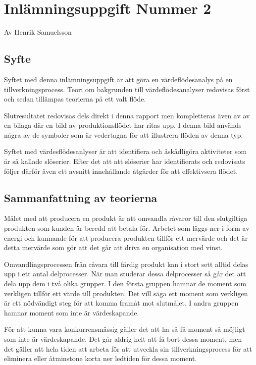 \documentclass{article}
\begin{document}
\section*{Inlämningsuppgift Nummer 2}
Av Henrik Samuelsson
\subsection*{Syfte}
Syftet med denna inlämningsuppgift är att göra en värdeflödesanalys på en tillverkningsprocess. Teori om bakgrunden till värdeflödesanalyser redovisas först och sedan tillämpas teorierna på ett valt flöde.

Slutresultatet redovisas dels direkt i denna rapport men kompletteras även av av en bilaga där en bild av produktionsflödet har ritas upp. I denna bild används några av de symboler som är vedertagna för att illustrera flöden av denna typ.

Syftet med värdesflödesanlyser är att identifiera och åskådligöra aktiviteter som är så kallade slöserier. Efter det att att slöserier har identifierats och redovisats följer därför även ett avsnitt innehållande åtgärder för att effektivsera flödet.

\subsection*{Sammanfattning av teorierna}
Målet med att producera en produkt är att omvandla råvaror till den slutgiltiga produkten som kunden är beredd att betala för. Arbetet som läggs ner i form av energi och kunnande för att producera produkten tillför ett mervärde och det är detta mervärde som gör att det går att driva en organisation med vinst.

Omvandlingsprocessen från råvara till färdig produkt kan i stort sett alltid delas upp i ett antal delprocesser. När man studerar dessa delprocesser så går det att dela upp dem i två olika grupper. I den första gruppen hamnar de moment som verkligen tillför ett värde till produkten. Det vill säga ett moment som verkligen är ett nödvändigt steg för att komma framåt mot slutmålet. I andra gruppen hamnar moment som inte är värdeskapande.

För att kunna vara konkurrensmässig gäller det att ha så få moment så möjligt som inte är värdeskapande. Det går aldrig helt att få bort dessa moment, men det gäller att hela tiden att arbeta för att utveckla sin tillverkningsprocess för att eliminera eller åtminstone korta ner ledtiden för dessa moment. 
\end{document}
